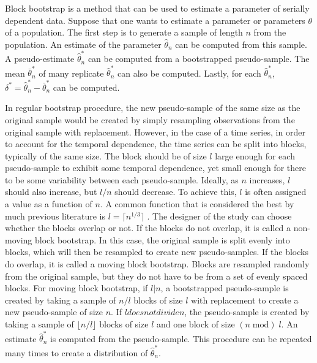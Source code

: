 \documentclass[12pt, letterpaper, titlepage]{article}
\begin{document}
Block bootstrap is a method that can be used to estimate a parameter of serially dependent data. Suppose that one wants to estimate a parameter or parameters $\theta$ of a population. The first step is to generate a sample of length $n$ from the population. An estimate of the parameter $\hat{\theta}_{n}$ can be computed from this sample. A pseudo-estimate $\hat\theta_n^*$ can be computed from a bootstrapped pseudo-sample. The mean $\bar\theta_n^*$ of many replicate $\hat\theta_n^*$ can also be computed. Lastly, for each $\hat\theta_n^*$, $\delta^* = \hat\theta_n^* - \bar\theta_n^*$ can be computed.

In regular bootstrap procedure, the new pseudo-sample of the same size as the original sample would be created by simply resampling observations from the original sample with replacement. However, in the case of a time series, in order to account for the temporal dependence, the time series can be split into blocks, typically of the same size. The block should be of size $l$ large enough for each pseudo-sample to exhibit some temporal dependence, yet small enough for there to be some variability between each pseudo-sample. Ideally, as $n$ increases, $l$ should also increase, but $l / n$ should decrease. To achieve this, $l$ is often assigned a value as a function of $n$. A common function that is considered the best by much previous literature is $l = \lceil n^{1/3} \rceil$ \citep{buhlmann1999block}. The designer of the study can choose whether the blocks overlap or not. If the blocks do not overlap, it is called a non-moving block bootstrap. In this case, the original sample is split evenly into blocks, which will then be resampled to create new pseudo-samples. If the blocks do overlap, it is called a moving block bootstrap. Blocks are resampled randomly from the original sample, but they do not have to be from a set of evenly spaced blocks. For moving block bootstrap, if $l \vert n$, a bootstrapped pseudo-sample is created by taking a sample of $n / l$ blocks of size $l$ with replacement to create a new pseudo-sample of size $n$. If $l does not divide n$, the pseudo-sample is created by taking a sample of $\lfloor n / l \rfloor$ blocks of size $l$ and one block of size $(n \;\mathrm{mod})\; l$. An estimate $\hat\theta_n^*$ is computed from the pseudo-sample. This procedure can be repeated many times to create a distribution of $\hat\theta_n^*$. 
\end{document}
